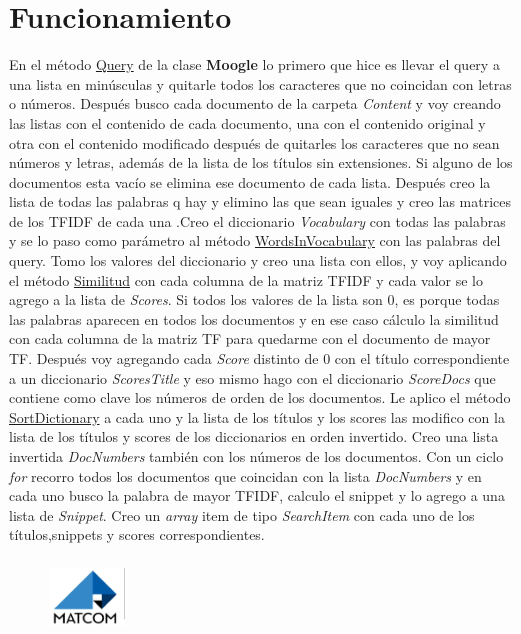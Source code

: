 \documentclass[a4paper,12pt]{article}
\begin{document}
\section{Funcionamiento}
En el método \underline{Query} de la clase \textbf{Moogle} lo primero que hice es llevar el
query a una lista en minúsculas y quitarle todos los caracteres que no
coincidan con letras o números. Después busco cada documento de la
carpeta \emph{Content} y voy creando las listas con el contenido de cada
documento, una con el contenido original y otra con el contenido
modificado después de quitarles los caracteres que no sean números y
letras, además de la lista de los títulos sin extensiones. Si alguno de los
documentos esta vacío se elimina ese documento de cada lista. Después
creo la lista de todas las palabras q hay y elimino las que sean iguales y
creo las matrices de los TFIDF de cada una .Creo el diccionario \emph{Vocabulary}
con todas las palabras y se lo paso como parámetro al método
\underline{WordsInVocabulary} con las palabras del query. Tomo los valores del
diccionario y creo una lista con ellos, y voy aplicando el método \underline{Similitud}
con cada columna de la matriz TFIDF y cada valor se lo agrego a la lista
de \emph{Scores}. Si todos los valores de la lista son 0, es porque todas las
palabras aparecen en todos los documentos y en ese caso cálculo la
similitud con cada columna de la matriz TF para quedarme con el
documento de mayor TF. Después voy agregando cada \emph{Score} distinto de
0 con el título correspondiente a un diccionario \emph{ScoresTitle} y eso mismo
hago con el diccionario \emph{ScoreDocs} que contiene como clave los números
de orden de los documentos. Le aplico el método \underline{SortDictionary} a cada
uno y la lista de los títulos y los scores las modifico con la lista de los títulos
y scores de los diccionarios en orden invertido. Creo una lista invertida
\emph{DocNumbers} también con los números de los documentos. Con un ciclo
\emph{for} recorro todos los documentos que coincidan con la lista \emph{DocNumbers} y
en cada uno busco la palabra de mayor TFIDF, calculo el
snippet y lo agrego a una lista de \emph{Snippet}. Creo un \emph{array }item de tipo
\emph{SearchItem} con cada uno de los títulos,snippets y scores
correspondientes.\\
\begin{figure}[t]
    \hspace{13cm}
\includegraphics[width=2cm,height=2cm]{Logo de Matcom.png}
\end{figure}
\end{document}
